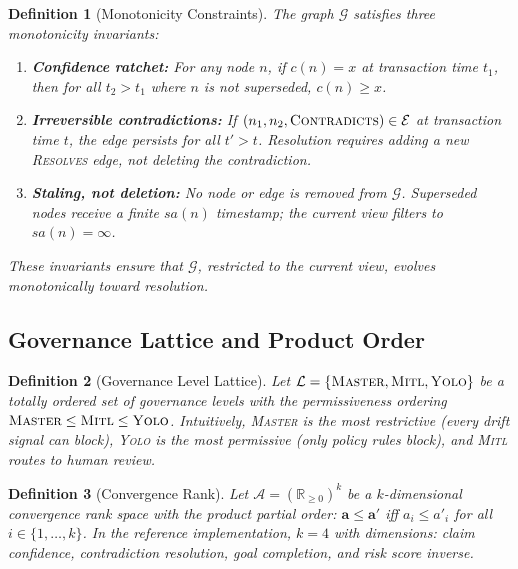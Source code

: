 \documentclass[11pt]{article}
\newtheorem{definition}{Definition}
\begin{document}
\begin{definition}[Monotonicity Constraints]
\label{def:monotonicity}
The graph $\mathcal{G}$ satisfies three monotonicity invariants:
\begin{enumerate}
  \item \textbf{Confidence ratchet:} For any node $n$, if $c(n) = x$ at transaction time $t_1$, then for all $t_2 > t_1$ where $n$ is not superseded, $c(n) \geq x$.
  \item \textbf{Irreversible contradictions:} If $(n_1, n_2, \textnormal{\textsc{Contradicts}}) \in \mathcal{E}$ at transaction time $t$, the edge persists for all $t' > t$. Resolution requires adding a new \textnormal{\textsc{Resolves}} edge, not deleting the contradiction.
  \item \textbf{Staling, not deletion:} No node or edge is removed from $\mathcal{G}$. Superseded nodes receive a finite $\textit{sa}(n)$ timestamp; the current view filters to $\textit{sa}(n) = \infty$.
\end{enumerate}
These invariants ensure that $\mathcal{G}$, restricted to the current view, evolves monotonically toward resolution.
\end{definition}

\subsection{Governance Lattice and Product Order}

\begin{definition}[Governance Level Lattice]
\label{def:gov-lattice}
Let $\mathcal{L} = \{\textsc{Master}, \textsc{Mitl}, \textsc{Yolo}\}$ be a totally ordered set of governance levels with the permissiveness ordering $\textsc{Master} \leq \textsc{Mitl} \leq \textsc{Yolo}$. Intuitively, \textsc{Master} is the most restrictive (every drift signal can block), \textsc{Yolo} is the most permissive (only policy rules block), and \textsc{Mitl} routes to human review.
\end{definition}

\begin{definition}[Convergence Rank]
\label{def:conv-rank}
Let $\mathcal{A} = (\mathbb{R}_{\geq 0})^k$ be a $k$-dimensional convergence rank space with the product partial order: $\mathbf{a} \leq \mathbf{a}'$ iff $a_i \leq a'_i$ for all $i \in \{1, \ldots, k\}$. In the reference implementation, $k = 4$ with dimensions: claim confidence, contradiction resolution, goal completion, and risk score inverse.
\end{definition}
\end{document}
